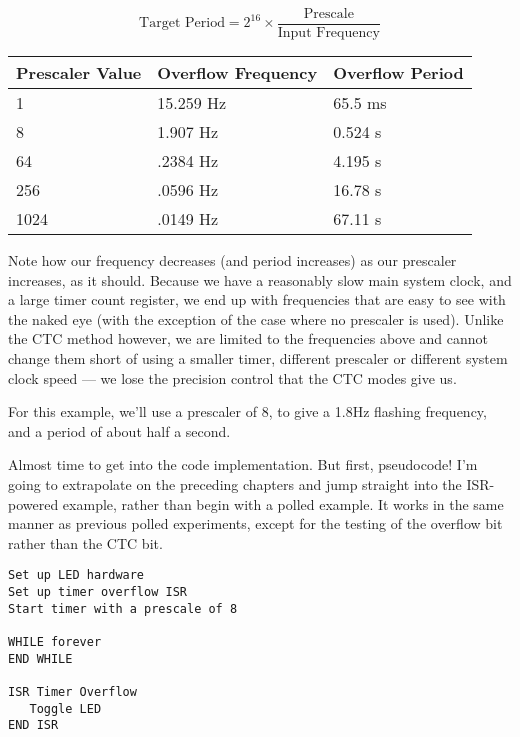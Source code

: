\documentclass[a4paper,oneside,notitlepage]{book}
\begin{document}
\begin{displaymath}
\text{Target Period} = 2^{16} \times \frac{\text{Prescale}}{\text{Input Frequency}}
\end{displaymath}

\begin{center}
\begin{tabular}{|l|l|l|}
	\hline
	Prescaler Value & Overflow Frequency & Overflow Period  \\
	\hline
	1    & 15.259 Hz & 65.5 ms \\
	8    & 1.907 Hz  & 0.524 s \\
	64   & .2384 Hz  & 4.195 s \\
	256  & .0596 Hz  & 16.78 s \\
	1024 & .0149 Hz  & 67.11 s \\
	\hline
\end{tabular}
\end{center}

Note how our frequency decreases (and period increases) as our prescaler increases, as it should. Because we have a reasonably slow main system clock, and a large timer count register, we end up with frequencies that are easy to see with the naked eye (with the exception of the case where no prescaler is used). Unlike the CTC method however, we are limited to the frequencies above and cannot change them short of using a smaller timer, different prescaler or different system clock speed --- we lose the precision control that the CTC modes give us.

For this example, we'll use a prescaler of 8, to give a 1.8Hz flashing frequency, and a period of about half a second.

Almost time to get into the code implementation. But first, pseudocode! I'm going to extrapolate on the preceding chapters and jump straight into the ISR-powered example, rather than begin with a polled example. It works in the same manner as previous polled experiments, except for the testing of the overflow bit rather than the CTC bit.

\begin{center}
\begin{lstlisting}[keywordstyle=\color{black},commentstyle=\color{black}]
Set up LED hardware
Set up timer overflow ISR
Start timer with a prescale of 8

WHILE forever
END WHILE

ISR Timer Overflow
   Toggle LED
END ISR
\end{lstlisting}
\end{center}
\end{document}
